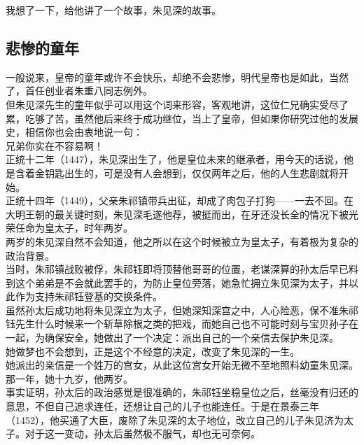\begin{multicols}{\theparacolNo}
我想了一下，给他讲了一个故事，朱见深的故事。\\

\subsection{悲惨的童年}
一般说来，皇帝的童年或许不会快乐，却绝不会悲惨，明代皇帝也是如此，当然了，首任创业者朱重八同志例外。\\

但朱见深先生的童年似乎可以用这个词来形容，客观地讲，这位仁兄确实受尽了累，吃够了苦，虽然他后来终于成功继位，当上了皇帝，但如果你研究过他的发展史，相信你也会由衷地说一句：\\

兄弟你实在不容易啊！\\

正统十二年（1447），朱见深出生了，他是皇位未来的继承者，用今天的话说，他是含着金钥匙出生的，可是没有人会想到，仅仅两年之后，他的人生悲剧就将开始。\\

正统十四年（1449），父亲朱祁镇带兵出征，却成了肉包子打狗——一去不回。在大明王朝的最关键时刻，朱见深毛遂他荐，被挺而出，在牙还没长全的情况下被光荣任命为皇太子，时年两岁。\\

两岁的朱见深自然不会知道，他之所以在这个时候被立为皇太子，有着极为复杂的政治背景。\\

当时，朱祁镇战败被俘，朱祁钰即将顶替他哥哥的位置，老谋深算的孙太后早已料到这个弟弟是不会就此罢手的，为防止皇位旁落，她急忙拥立朱见深为太子，并以此作为支持朱祁钰登基的交换条件。\\

虽然孙太后成功地将朱见深立为太子，但她深知深宫之中，人心险恶，保不准朱祁钰先生什么时候来一个斩草除根之类的把戏，而她自己也不可能时刻与宝贝孙子在一起，为确保安全，她做出了一个决定：派出自己的一个亲信去保护朱见深。\\

她做梦也不会想到，正是这个不经意的决定，改变了朱见深的一生。\\

她派出的亲信是一个姓万的宫女，从此这位宫女开始无微不至地照料幼童朱见深。\\

那一年，她十九岁，他两岁。\\

事实证明，孙太后的政治感觉是很准确的，朱祁钰坐稳皇位之后，丝毫没有归还的意思，不但自己追求连任，还想让自己的儿子也能连任。于是在景泰三年（1452），他买通了大臣，废除了朱见深的太子地位，改立自己的儿子朱见济为太子。对于这一变动，孙太后虽然极不服气，却也无可奈何。\\


\end{multicols}
